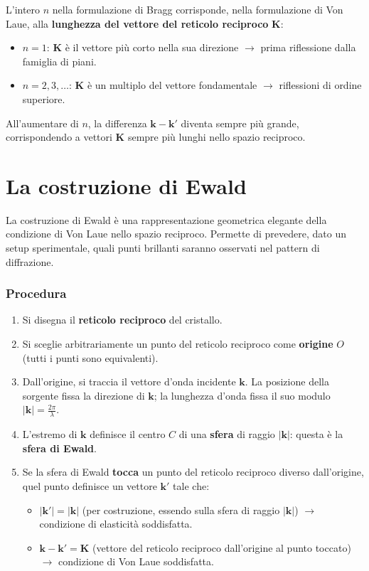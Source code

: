 L'intero $n$ nella formulazione di Bragg corrisponde, nella formulazione di Von Laue, alla \textbf{lunghezza del vettore del reticolo reciproco} $\mathbf{K}$:

\begin{itemize}
    \item $n = 1$: $\mathbf{K}$ è il vettore più corto nella sua direzione $\to$ prima riflessione dalla famiglia di piani.
    \item $n = 2, 3, \ldots$: $\mathbf{K}$ è un multiplo del vettore fondamentale $\to$ riflessioni di ordine superiore.
\end{itemize}

All'aumentare di $n$, la differenza $\mathbf{k} - \mathbf{k}'$ diventa sempre più grande, corrispondendo a vettori $\mathbf{K}$ sempre più lunghi nello spazio reciproco.

\section{La costruzione di Ewald}


La costruzione di Ewald è una rappresentazione geometrica elegante della condizione di Von Laue nello spazio reciproco. Permette di prevedere, dato un setup sperimentale, quali punti brillanti saranno osservati nel pattern di diffrazione.

\subsubsection{Procedura}

\begin{enumerate}
    \item Si disegna il \textbf{reticolo reciproco} del cristallo.
    \item Si sceglie arbitrariamente un punto del reticolo reciproco come \textbf{origine} $O$ (tutti i punti sono equivalenti).
    \item Dall'origine, si traccia il vettore d'onda incidente $\mathbf{k}$. La posizione della sorgente fissa la direzione di $\mathbf{k}$; la lunghezza d'onda fissa il suo modulo $|\mathbf{k}| = \frac{2\pi}{\lambda}$.
    \item L'estremo di $\mathbf{k}$ definisce il centro $C$ di una \textbf{sfera} di raggio $|\mathbf{k}|$: questa è la \textbf{sfera di Ewald}.
    \item Se la sfera di Ewald \textbf{tocca} un punto del reticolo reciproco diverso dall'origine, quel punto definisce un vettore $\mathbf{k}'$ tale che:
    \begin{itemize}
        \item $|\mathbf{k}'| = |\mathbf{k}|$ (per costruzione, essendo sulla sfera di raggio $|\mathbf{k}|$) $\to$ condizione di elasticità soddisfatta.
        \item $\mathbf{k} - \mathbf{k}' = \mathbf{K}$ (vettore del reticolo reciproco dall'origine al punto toccato) $\to$ condizione di Von Laue soddisfatta.
    \end{itemize}
\end{enumerate}

